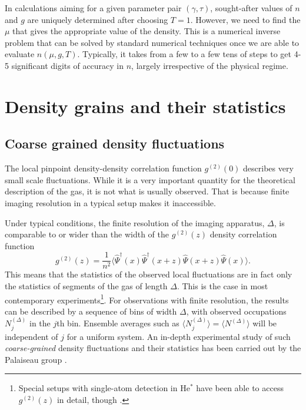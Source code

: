 \documentclass[aps,twocolumn,pra,superscriptaddress,nofootinbib,amsmath,amssymb,floats,floatfix,english]{revtex4-1}
\newcommand{\op}[1]{\widehat{#1}}
\newcommand{\dagop}[1]{\widehat{#1}^{\dagger}}
\renewcommand{\eq}[2]{\begin{equation}\label{#1}#2\end{equation}}
\begin{document}
In calculations aiming for a given parameter pair $(\gamma,\tau)$,  sought-after values of $n$ and $g$ are uniquely determined after choosing $T=1$. However, we  need to find the $\mu$ that gives the appropriate value of the density. This is a numerical inverse problem that can be solved by standard numerical techniques once we are able to evaluate $n(\mu,g,T)$. Typically, it  takes from a few to a few tens of steps to get 4-5 significant digits of accuracy in $n$, largely irrespective of the physical regime.

\section{Density grains and their statistics}
\label{DGR}
\subsection{Coarse grained density fluctuations }
\label{UG}

The local pinpoint density-density correlation function $g^{(2)}(0)$ describes very small scale fluctuations. 
While it is a very important quantity for the theoretical description of the gas, it is not what is usually observed. That is because finite imaging resolution in a typical setup makes it inaccessible. 

Under typical conditions, the finite resolution of the imaging apparatus, $\Delta$, is comparable to or wider than the width of the $g^{(2)}(z)$ density correlation function
\eq{g2zdef}{
g^{(2)}(z) = \frac{1}{n^2}\langle\dagop{\Psi}(x)\dagop{\Psi}(x+z)\op{\Psi}(x+z)\op{\Psi}(x)\rangle.
}
This means that the statistics of the observed local fluctuations are in fact only the statistics of segments of the gas of length $\Delta$. 
This is the case in most contemporary experiments\footnote{Special setups with single-atom detection in He${}^*$ have been able to access $g^{(2)}(z)$ in detail, though \cite{Perrin07,Jaskula10,Kheruntsyan12,Dall13,Manning13}.}.
For observations with finite resolution, the results can be described by a sequence of bins of width $\Delta$, with observed occupations $N_j^{(\Delta)}$ in the $j$th bin. 
Ensemble averages such as $\langle N_j^{(\Delta)}\rangle = \langle N^{(\Delta)}\rangle$ will be independent of $j$ for a uniform system.
An in-depth experimental study of such \emph{coarse-grained} density fluctuations and their statistics has been carried out by the Palaiseau group \cite{Armijo10,Armijo11,Jacqmin11,Armijo12}. 
\end{document}
